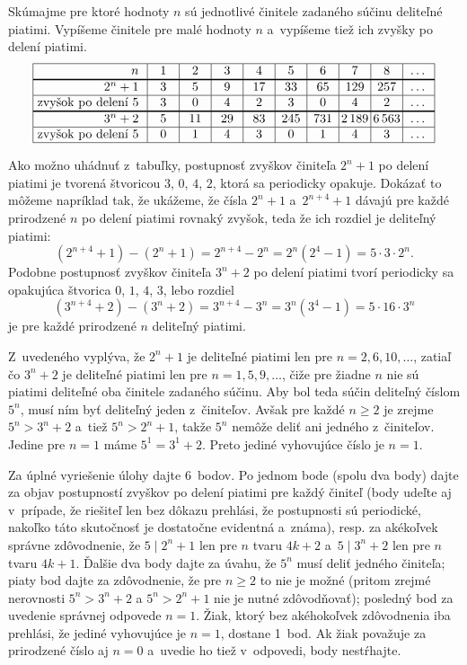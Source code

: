 {%
Skúmajme pre ktoré hodnoty $n$ sú jednotlivé činitele zadaného súčinu deliteľné piatimi. Vypíšeme činitele pre malé hodnoty $n$ a~vypíšeme tiež ich zvyšky po delení piatimi.
$$
\vbox{\offinterlineskip
       \halign{\strut\vrule\ \hfil # \vrule&&\hbox to 2.5em{\hss$#$\hss}\vrule\cr
\noalign{\hrule}
$n$                & 1 & 2 & 3 &  4 &  5 &  6 &   7 &   8 & \dots\cr
\noalign{\hrule height1pt}
$2^n+1$            & 3 & 5 & 9 & 17 & 33 & 65 & 129 & 257 & \dots\cr
\noalign{\hrule}
zvyšok po delení 5 & 3 & 0 & 4 &  2 &  3 &  0 &   4 &   2 &\dots\cr
\noalign{\hrule height1pt}
$3^n+2$            & 5 & 11 & 29 & 83 & 245 & 731 & 2\,189 & 6\,563 & \dots\cr
\noalign{\hrule}
zvyšok po delení 5 & 0 &  1 &  4 &  3 &  0 &    1 &   4    &   3 &\dots\cr
\noalign{\hrule}
}}
$$

Ako možno uhádnuť z~tabuľky, postupnosť zvyškov činiteľa $2^n+1$ po delení piatimi je tvorená štvoricou $3$, $0$, $4$, $2$, ktorá sa periodicky opakuje. Dokázať to môžeme napríklad tak, že ukážeme, že čísla $2^n+1$ a~$2^{n+4}+1$ dávajú pre každé prirodzené $n$ po delení piatimi rovnaký zvyšok, teda že ich rozdiel je deliteľný piatimi:
$$
(2^{n+4}+1)-(2^n+1)=2^{n+4}-2^n = 2^n(2^4-1)=5\cdot3\cdot2^n.
$$
Podobne postupnosť zvyškov činiteľa $3^n+2$ po delení piatimi tvorí periodicky sa opakujúca štvorica $0$, $1$, $4$, $3$, lebo rozdiel
$$
(3^{n+4}+2)-(3^n+2)=3^{n+4}-3^n=3^n(3^4-1)=5\cdot16\cdot3^n
$$
je pre každé prirodzené $n$ deliteľný piatimi.

Z~uvedeného vyplýva, že $2^n+1$ je deliteľné piatimi len pre $n=2,6,10,\dots$, zatiaľ čo $3^n+2$ je deliteľné piatimi len pre $n=1,5,9,\dots$, čiže pre žiadne $n$ nie sú piatimi deliteľné oba činitele zadaného súčinu. Aby bol teda súčin deliteľný číslom $5^n$, musí ním byť deliteľný jeden z~činiteľov. Avšak pre každé $n\ge2$ je zrejme $5^n>3^n+2$ a~tiež $5^n>2^n+1$, takže $5^n$ nemôže deliť ani jedného z~činiteľov. Jedine pre $n=1$ máme $5^1=3^1+2$.
Preto jediné vyhovujúce číslo je $n=1$.

\nobreak\medskip\petit\noindent
Za úplné vyriešenie úlohy dajte 6~bodov. Po jednom bode (spolu dva body) dajte za objav postupností zvyškov po delení piatimi pre každý činiteľ (body udeľte aj v~prípade, že riešiteľ len bez dôkazu prehlási, že postupnosti sú periodické, nakoľko táto skutočnosť je dostatočne evidentná a~známa), resp. za akékoľvek správne zdôvodnenie, že $5\mid 2^n+1$ len pre $n$ tvaru $4k+2$ a~$5\mid3^n+2$ len pre $n$ tvaru $4k+1$. Ďalšie dva body dajte za úvahu, že $5^n$ musí deliť jedného činiteľa; piaty bod dajte za zdôvodnenie, že pre $n\ge2$ to nie je možné (pritom zrejmé nerovnosti
$5^n>3^n+2$ a  $5^n>2^n+1$ nie je nutné zdôvodňovať); posledný bod za uvedenie správnej odpovede $n=1$. Žiak, ktorý bez akéhokoľvek zdôvodnenia iba prehlási, že jediné vyhovujúce je $n=1$, dostane 1~bod. Ak žiak považuje za prirodzené číslo aj $n=0$ a~uvedie ho tiež v~odpovedi, body nestŕhajte.
\endpetit
\bigbreak
}


